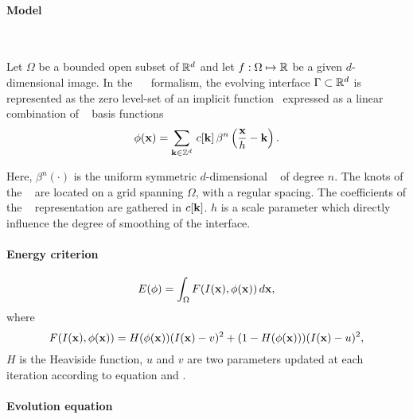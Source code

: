 \paragraph{Model}
~\par \vspace{0.3cm}

Let $\Omega$ be a bounded open subset of $\mathbb{R}^{d}$ and let $f:\Omega\mapsto\mathbb{R}$ be a given $d$-dimensional image. In the \bs~\ls~ formalism, the evolving interface $\Gamma\subset\mathbb{R}^{d}$ is represented as the zero level-set of an implicit function \LS~expressed as a linear combination of \bs~ basis functions
\begin{equation}
\label{eq:phi-bernard}
\phi({\mathbf{x}})=\sum_{{\mathbf{k}}\in{\mathbb{Z}}^{d}}\,c[{\mathbf{k}}]\,\beta^{n} \left(\frac{{\mathbf{x}}}{h}-{\mathbf{k}}\right).
\end{equation}

Here, $\beta^{n}(\cdot)$ is the uniform symmetric $d$-dimensional \bs~ of degree $n$. The knots of the \bs~ are located on a grid spanning $\Omega$, with a regular spacing. The coefficients of the \bs~ representation are gathered in $c[\mathbf{k}]$. $h$ is a scale parameter which directly influence the degree of smoothing of the interface.

\paragraph{Energy criterion}
\begin{equation}
	\label{eq:NRJ-bernard}
	E(\phi) = \int_{\Omega} F(I(\mathbf{x}),\phi(\mathbf{x})) \, d\mathbf{x},
\end{equation}
where 
\begin{equation}
	\label{eq:F_bernard}
	F(I(\mathbf{x}),\phi(\mathbf{x})) = H(\phi(\mathbf{x}))(I(\mathbf{x}) - v)^2 + (1 - H(\phi(\mathbf{x})))(I(\mathbf{x}) - u)^2,
\end{equation}
$H$ is the Heaviside function, $u$ and $v$ are two parameters updated at each iteration according to equation  and .

\paragraph{Evolution equation}
~\par \vspace{0.3cm}

